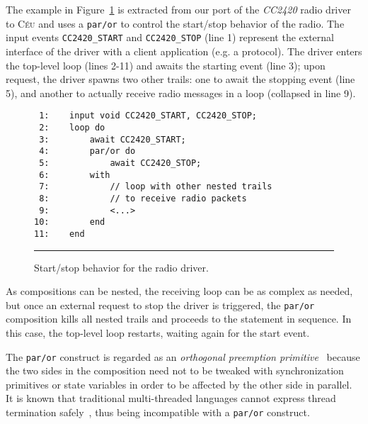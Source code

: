 \documentclass[10pt]{sensys-proc}
\newcommand{\CEU}{\textsc{C\'{e}u}\xspace}
\newcommand{\code}[1] {{\small{\texttt{#1}}}}
\begin{document}
The example in Figure~\ref{lst.radio} is extracted from our port of the 
\emph{CC2420} radio driver~\cite{wsn.teps} to \CEU and uses a \code{par/or} to 
control the start/stop behavior of the radio.
The input events \code{CC2420\_START} and \code{CC2420\_STOP} (line 1) 
represent the external interface of the driver with a client application (e.g.  
a protocol).
The driver enters the top-level loop (lines 2-11) and awaits the starting event 
(line 3);
upon request, the driver spawns two other trails:
one to await the stopping event (line 5),
and another to actually receive radio messages in a loop (collapsed in line 9).
%
\begin{figure}[t]
{\small
\begin{verbatim}
 1:    input void CC2420_START, CC2420_STOP;
 2:    loop do
 3:        await CC2420_START;
 4:        par/or do
 5:            await CC2420_STOP;
 6:        with
 7:            // loop with other nested trails
 8:            // to receive radio packets
 9:            <...>
10:        end
11:    end
\end{verbatim}
}%
\rule{8.5cm}{0.37pt}
\caption{ Start/stop behavior for the radio driver.
\label{lst.radio}
}
\end{figure}
%
As compositions can be nested, the receiving loop can be as complex as needed, 
but once an external request to stop the driver is triggered, the \code{par/or} 
composition kills all nested trails and proceeds to the statement in sequence.
In this case, the top-level loop restarts, waiting again for the start event.

The \code{par/or} construct is regarded as an \emph{orthogonal preemption 
primitive}~\cite{esterel.preemption} because the two sides in the composition 
need not to be tweaked with synchronization primitives or state variables in
order to be affected by the other side in parallel.
It is known that traditional multi-threaded languages cannot express thread 
termination safely~\cite{esterel.preemption,sync_async.threadsstop}, thus being 
incompatible with a \code{par/or} construct.

\begin{comment}
The same start/stop control pattern for the radio driver appears in all ported 
network protocols presented in Section~\ref{sec.eval}.
In practical terms, parallel compositions eliminated all state variables in our 
ports, not only those related to split-phase 
operations~\cite{wsn.protothreads}.
\end{comment}
\end{document}
